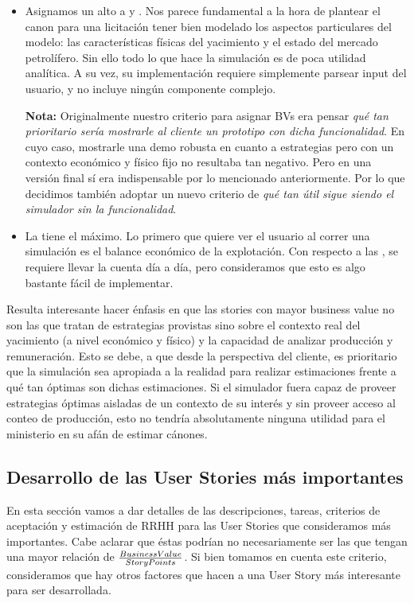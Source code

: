 \begin{itemize}
    \item Asignamos un alto \BV{} a  y . Nos parece fundamental a la hora de plantear el canon para una licitación tener bien modelado los aspectos particulares del modelo: las características físicas del yacimiento y el estado del mercado petrolífero. Sin ello todo lo que hace la simulación es de poca utilidad analítica. A su vez, su implementación requiere simplemente parsear input del usuario, y no incluye ningún componente complejo.

    \textbf{Nota:} Originalmente nuestro criterio para asignar BVs era pensar \emph{qué tan prioritario sería mostrarle al cliente un prototipo con dicha funcionalidad}. En cuyo caso, mostrarle una demo robusta en cuanto a estrategias pero con un contexto económico y físico fijo no resultaba tan negativo. Pero en una versión final sí era indispensable por lo mencionado anteriormente. Por lo que decidimos también adoptar un nuevo criterio de \emph{qué tan útil sigue siendo el simulador sin la funcionalidad}.

    \item La  tiene el \BV{} máximo. Lo primero que quiere ver el usuario al correr una simulación es el balance económico de la explotación. Con respecto a las \SP{}, se requiere llevar la cuenta día a día, pero consideramos que esto es algo bastante fácil de implementar.
\end{itemize}

Resulta interesante hacer énfasis en que las stories con mayor business value no son las que tratan de estrategias provistas sino sobre el contexto real del yacimiento (a nivel económico y físico) y la capacidad de analizar producción y remuneración. Esto se debe, a que desde la perspectiva del cliente, es prioritario que la simulación sea apropiada a la realidad para realizar estimaciones frente a qué tan óptimas son dichas estimaciones. Si el simulador fuera capaz de proveer estrategias óptimas aisladas de un contexto de su interés y sin proveer acceso al conteo de producción, esto no tendría absolutamente ninguna utilidad para el ministerio en su afán de estimar cánones.

\newpage
\subsection{Desarrollo de las User Stories más importantes}

En esta sección vamos a dar detalles de las descripciones, tareas, criterios de aceptación y estimación de RRHH para las User Stories que consideramos más importantes. Cabe aclarar que éstas podrían no necesariamente ser las que tengan una mayor relación de \( \frac{Business Value{}}{Story Points{}} \). Si bien tomamos en cuenta este criterio, consideramos que hay otros factores que hacen a una User Story más interesante para ser desarrollada.

